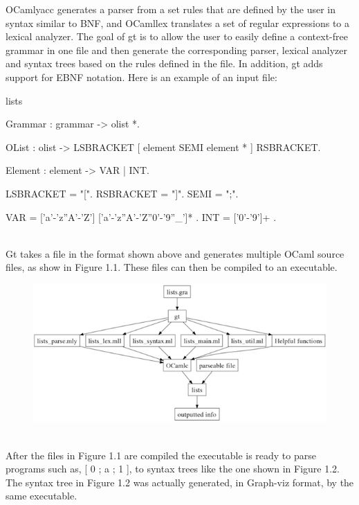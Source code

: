 OCamlyacc generates a parser from a set rules that are defined by the user in syntax similar to BNF, and OCamllex 
translates a set of regular expressions to a lexical analyzer. The goal of gt is to allow the user to easily 
define a context-free grammar in one file and then generate the corresponding parser, lexical analyzer and syntax
trees based on the rules defined in the file. In addition, gt adds support for EBNF notation. Here is an example 
of an input file: \\
\begin{gt} 
lists

Grammar : grammar -> { olist }*.

OList : olist -> LSBRACKET [ element { SEMI element }* ] RSBRACKET.

Element :  element -> VAR | INT.

LSBRACKET = "[".
RSBRACKET = "]".
SEMI = ";".

VAR = {{ ['a'-'z''A'-'Z'] ['a'-'z''A'-'Z''0'-'9''_']* }}.
INT = {{ ['0'-'9']+ }}.
\end{gt}\ \\
Gt takes a file in the format shown above and generates multiple OCaml source files, as show in Figure 1.1. These
files can then be compiled to an executable.

\begin{figure}[h!]
  \centering
  \includegraphics[width=5.3in]{./intro/gt.png}
  \caption{}
\end{figure}\ \\
After the files in Figure 1.1 are compiled the executable is ready to parse programs such as, [ 0 ; a ; 1 ], to
syntax trees like the one shown in Figure 1.2. The syntax tree in Figure 1.2 was actually generated, in Graph-viz
format, by the same executable.

